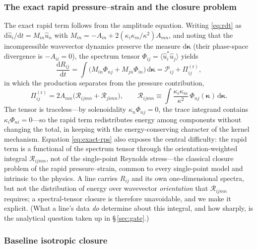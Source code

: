 \documentclass[11pt,a4paper]{article}
\begin{document}
\subsubsection{The exact rapid pressure--strain and the closure problem}
\label{sec:closure-problem}

The exact rapid term follows from the amplitude equation. Writing
\eqref{eq:rdt} as $\mathrm{d}\hat u_i/\mathrm{d}t=M_{in}\hat u_n$ with
$M_{in}=-A_{in}+2(\kappa_i\kappa_m/\kappa^2)A_{mn}$, and noting that the
incompressible wavevector dynamics preserve the measure
$\mathrm{d}\boldsymbol{\kappa}$ (their phase-space divergence is
$-A_{ii}=0$), the spectrum tensor
$\Phi_{ij}=\langle\hat u_i^{*}\hat u_j\rangle$ yields
\begin{equation}
  \frac{\mathrm{d}R_{ij}}{\mathrm{d}t}
  = \int\!\big(M_{in}\Phi_{nj}+M_{jn}\Phi_{in}\big)\,
    \mathrm{d}\boldsymbol{\kappa}
  = \mathcal{P}_{ij} + \Pi^{(\mathrm r)}_{ij},
  \label{eq:dRdt-rdt}
\end{equation}
in which the production separates from the pressure contribution,
\begin{equation}
  \Pi^{(\mathrm r)}_{ij}
  = 2A_{mn}\big(\mathcal{R}_{ijmn}+\mathcal{R}_{jimn}\big),
  \qquad
  \mathcal{R}_{ijmn} \equiv
  \int \frac{\kappa_i \kappa_m}{\kappa^2}\,
  \Phi_{nj}(\boldsymbol{\kappa})\,\mathrm{d}\boldsymbol{\kappa}.
  \label{eq:exact-rps}
\end{equation}
The tensor is traceless---by solenoidality $\kappa_n\Phi_{nj}=0$, the
trace integrand contains $\kappa_i\Phi_{ni}=0$---so the rapid term
redistributes energy among components without changing the total, in
keeping with the energy-conserving character of the kernel mechanism.
Equation \eqref{eq:exact-rps} also exposes the central difficulty: the
rapid term is a functional of the spectrum tensor through the
orientation-weighted integral $\mathcal{R}_{ijmn}$, not of the
single-point Reynolds stress---the classical closure problem of the rapid
pressure--strain, common to every single-point model
\citep{Crow1968,LaunderReeceRodi1975,Pope2000} and intrinsic to the
physics. A line carries $R_{ij}$ and its own one-dimensional spectra, but
not the distribution of energy over wavevector \emph{orientation} that
$\mathcal{R}_{ijmn}$ requires; a spectral-tensor closure is therefore
unavoidable, and we make it explicit. (What a line's data \emph{do}
determine about this integral, and how sharply, is the analytical
question taken up in \S\,\ref{sec:gate}.)

\subsubsection{Baseline isotropic closure}\label{sec:iso-closure}
\end{document}
